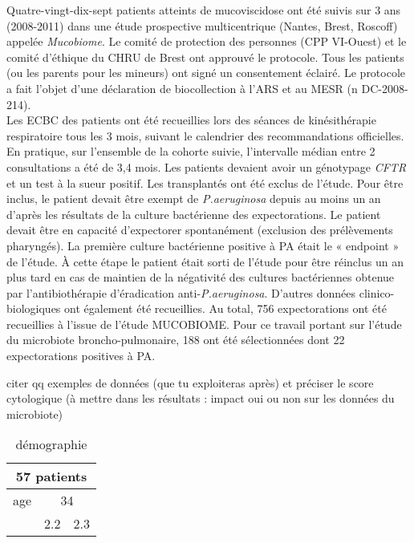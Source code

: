 \documentclass[12pt,a4paper]{article}
\begin{document}
Quatre-vingt-dix-sept patients atteints de mucoviscidose ont été suivis sur 3 ans (2008-2011) dans une étude prospective multicentrique (Nantes, Brest, Roscoff) appelée \textit{Mucobiome}.
Le comité de protection des personnes (CPP VI-Ouest) et le comité d’éthique du CHRU de Brest ont approuvé le protocole. Tous les patients (ou les parents pour les mineurs) ont signé un consentement éclairé. Le protocole a fait l’objet d’une déclaration de biocollection à l’ARS et au MESR (n DC-2008-214).\\
Les ECBC des patients ont été recueillies lors des séances de kinésithérapie respiratoire tous les 3 mois, suivant le calendrier des recommandations officielles. En pratique, sur l’ensemble de la cohorte suivie, l’intervalle médian entre 2 consultations a été de 3,4 mois.
Les patients devaient avoir un génotypage \textit{CFTR} et un test à la sueur positif. Les transplantés ont été exclus de l’étude.
Pour être inclus, le patient devait être exempt de \textit{P.aeruginosa} depuis au moins un an d’après les résultats de la culture bactérienne des expectorations. Le patient devait être en capacité d’expectorer spontanément (exclusion des prélèvements pharyngés).
La première culture bactérienne positive à PA était le « endpoint » de l’étude. À cette étape le patient était sorti de l’étude pour être réinclus un an plus tard en cas de maintien de la négativité des cultures bactériennes obtenue par l’antibiothérapie d’éradication anti-\textit{P.aeruginosa}. D’autres données clinico-biologiques ont également été recueillies. Au total, 756 expectorations ont été recueillies à l’issue de l’étude MUCOBIOME. Pour ce travail portant sur l’étude du microbiote broncho-pulmonaire, 188 ont été sélectionnées dont 22 expectorations positives à PA.

citer qq exemples de données (que tu exploiteras après) et préciser le score
cytologique (à mettre dans les résultats : impact oui ou non sur les données du microbiote)

\begin{table}[h]
\centering
   \caption{démographie}
   \begin{tabular}{|l|c|c}
        \hline
   \multicolumn{3}{|c|}{     57 patients     } \\
    \hline
    age & \multicolumn{2}{|c|}{34}  \\
    \hline

        & 2.2 & 2.3 \\
    \hline
   \end{tabular}
\end{table}
\end{document}
